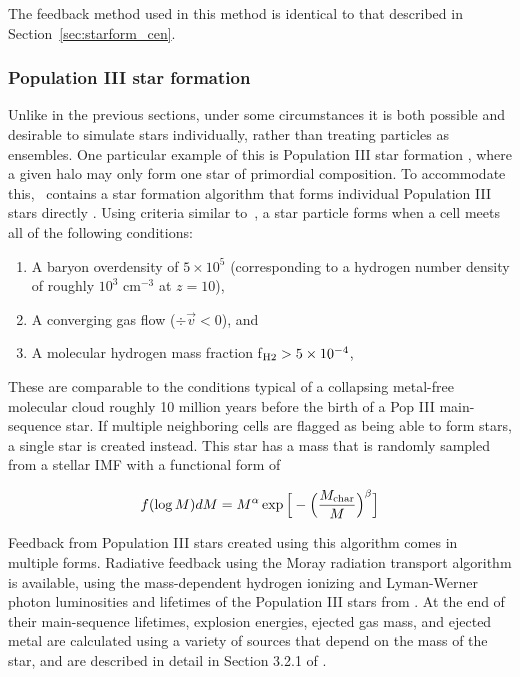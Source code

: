 The feedback method used in this method is identical to that described
in Section~\ref{sec:starform_cen}.

\subsubsection{Population III star formation}
\label{sec:starform_pop3}

Unlike in the previous sections, under some circumstances it is both
possible and desirable to simulate stars individually, rather than
treating particles as ensembles.  One particular example of this is
Population III star formation
\citep{ABN02,2007ApJ...654...66O,2008ApJ...685...40W,2009Sci...325..601T},
where a given halo may only form one star of primordial composition.
To accommodate this, \enzo\ contains a star formation algorithm that
forms individual Population III stars directly \citep{2007ApJ...659L..87A,
  2008ApJ...685...40W, 2012MNRAS.427..311W}.  Using criteria similar
to~\citet{CO1992}, a star particle forms when a cell meets all of the
following conditions:

\begin{enumerate}
\item A baryon overdensity of $5 \times 10^5$ (corresponding to a
  hydrogen number density of 
  roughly $10^3$ cm$^{-3}$ at $z=10$),

\item A converging gas flow ($\div \vec{v} < 0$), and

\item A molecular hydrogen mass fraction f$_{\rm H2} > 5 \times 10^{-4}$,
\end{enumerate}

These are comparable to the conditions typical of a collapsing metal-free molecular cloud roughly
10 million years before the birth of a Pop III main-sequence star.  If
multiple neighboring cells are flagged as being able to form stars, a
single star is created instead.  This star has a mass that is randomly
sampled from a stellar IMF with a functional form of

\begin{equation}
f(\log M) dM = M^{\alpha} \exp \Big[ -\Big( \frac{M_{\rm char}}{M}
\Big)^{\beta} \Big]
\end{equation}

Feedback from Population III stars created using this algorithm comes in multiple forms.
Radiative feedback using the Moray radiation transport algorithm
\citep{Wise11_Moray} is available, using the mass-dependent hydrogen
ionizing and Lyman-Werner photon luminosities and lifetimes of the
Population III stars from \citet{2002A&A...382...28S}.  At the end of
their main-sequence lifetimes, explosion energies, ejected gas mass,
and ejected metal are calculated using a variety of sources that
depend on the mass of the star, and are described in detail in Section
3.2.1 of \citet{2012MNRAS.427..311W}.


